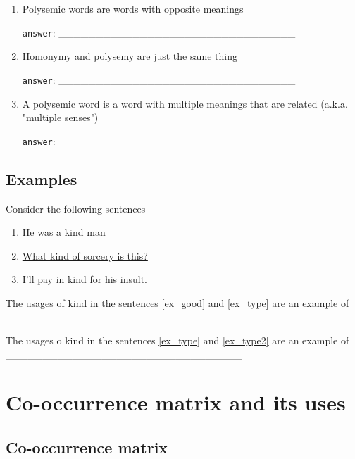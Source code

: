 \documentclass[a4paper,11pt]{scrartcl}
\begin{document}
\begin{enumerate}[label=\alph*)]
\item Polysemic words are words with opposite meanings

\verb|answer|: \_\_\_\_\_\_\_\_\_\_\_\_\_\_\_\_\_\_\_\_\_\_\_\_\_\_\_\_\_\_\_\_

\item Homonymy and polysemy are just the same thing

\verb|answer|: \_\_\_\_\_\_\_\_\_\_\_\_\_\_\_\_\_\_\_\_\_\_\_\_\_\_\_\_\_\_\_\_

\item A polysemic word is a word with multiple meanings that are related
      (a.k.a. "multiple senses")

\verb|answer|: \_\_\_\_\_\_\_\_\_\_\_\_\_\_\_\_\_\_\_\_\_\_\_\_\_\_\_\_\_\_\_\_
\end{enumerate}


\subsection{Examples}


Consider the following sentences

\begin{enumerate}[label=(\arabic*)]
\singlespacing%
\item \label{ex_good}  He was a kind man
\item \label{ex_type}  \href{https://knowyourmeme.com/memes/what-kind-of-sorcery-is-this}{What kind of sorcery is this?}
\item \label{ex_type2} \href{https://en.wiktionary.org/wiki/kind}{I'll pay in kind for his insult.}
\end{enumerate}

The usages of kind in the sentences \ref{ex_good} and \ref{ex_type} are an example of
\_\_\_\_\_\_\_\_\_\_\_\_\_\_\_\_\_\_\_\_\_\_\_\_\_\_\_\_\_\_\_\_

The usages o kind in the sentences \ref{ex_type} and \ref{ex_type2} are an example of
\_\_\_\_\_\_\_\_\_\_\_\_\_\_\_\_\_\_\_\_\_\_\_\_\_\_\_\_\_\_\_\_



\section{Co-occurrence matrix and its uses}

\subsection{Co-occurrence matrix}
\end{document}
